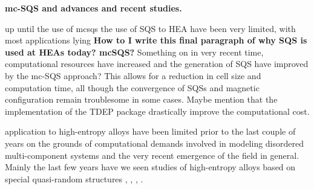 \textbf{mc-SQS and advances and recent studies.}

up until the use of mcsqs the use of SQS to HEA have been very limited, with most applications lying 
\textbf{How to I write this final paragraph of why SQS is used at HEAs today? mcSQS?}
Something on in very recent time, computational resources have increased and the generation of SQS have improved by the mc-SQS approach? This allows for a reduction in cell size and computation time, all though the convergence of SQSs and magnetic configuration remain troublesome in some cases. Maybe mention that the implementation of the TDEP package drastically improve the computational cost.     

 application to high-entropy alloys have been limited prior to the last couple of years on the grounds of computational demands involved in modeling disordered multi-component systems and the very recent emergence of the field in general. Mainly the last few years have we seen studies of high-entropy alloys based on special quasi-random structures \cite{WANG2021128754}, \cite{WEI2021167432}, \cite{RASHID2014285}, \cite{SORKIN2021160776}.   






























































